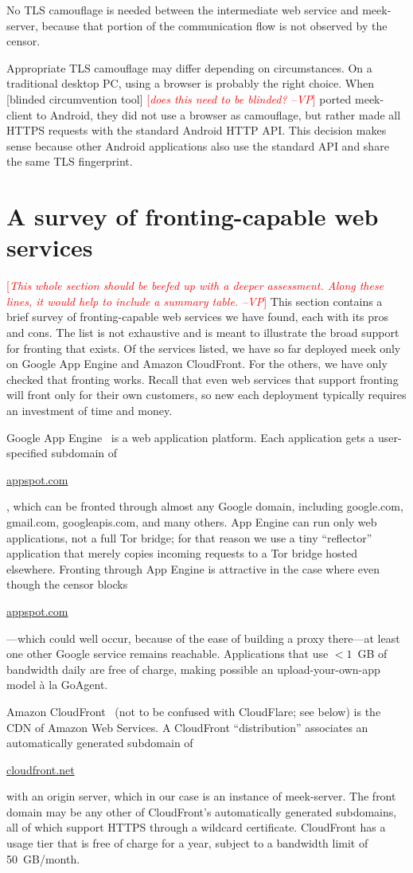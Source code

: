 \documentclass{sig-alternate}
\newcommand{\meekclient}{\mbox{meek-client}\xspace}
\newcommand{\meekserver}{\mbox{meek-server}\xspace}
\newcommand{\meek}{meek\xspace}
\def\urll#1{\begin{NoHyper}\url{#1}\end{NoHyper}}
\newcommand{\note}[1]{{\textcolor{red}{[\textit{#1}]}}}
\newcommand{\vp}[1]{\note{#1 --VP}}
\begin{document}
No TLS camouflage is needed between the intermediate web service and \meekserver,
because that portion of the communication flow is not observed by the censor.

Appropriate TLS camouflage may differ depending on circumstances.
On a traditional desktop PC, using a browser is probably the right choice.
When
[blinded circumvention tool]
\vp{does this need to be blinded?}
ported \meekclient to Android,
they did not use a browser as camouflage,
but rather made all HTTPS requests with the standard Android HTTP API.
This decision makes sense because other Android applications
also use the standard API and share the same TLS fingerprint.

\section{A survey of fronting-capable web services}
\label{sec:survey}

\vp{This whole section should be beefed up with a deeper assessment.  Along
these lines, it would help to include a summary table.}
This section contains a brief survey of fronting-capable
web services we have found, each with its pros and cons.
The list is not exhaustive and is meant to illustrate the broad
support for fronting that exists.
Of the services listed, we have so far deployed \meek
only on Google App Engine and Amazon CloudFront.
For the others, we have only checked that fronting works.
Recall that even web services that support fronting
will front only for their own customers,
so new each deployment typically requires an investment of time and money.

Google App Engine~\cite{googleappengine}
is a web application platform.
Each application gets a user-specified subdomain of \urll{appspot.com},
which can be fronted through almost any Google domain,
including google.com, gmail.com, googleapis.com, and many others.
App Engine can run only web applications,
not a full Tor bridge;
for that reason we use a tiny ``reflector'' application
that merely copies incoming requests to a Tor bridge hosted elsewhere.
Fronting through App Engine is attractive in the case where even though
the censor blocks
\urll{appspot.com}---which could well occur,
because of the ease of building a proxy there---at least one
other Google service remains reachable.
Applications that use $< 1$~GB of bandwidth daily
are free of charge,
making possible an upload-your-own-app model
à la GoAgent.

Amazon CloudFront~\cite{cloudfront}
(not to be confused with CloudFlare; see below)
is the CDN of Amazon Web Services.
A CloudFront ``distribution'' associates
an automatically generated subdomain of \urll{cloudfront.net}
with an origin server,
which in our case is an instance of \meekserver.
The front domain may be any other of CloudFront's automatically generated subdomains, all
of which support HTTPS through a wildcard certificate.
CloudFront has a usage tier that is free of charge for a year,
subject to a bandwidth limit of 50~GB/month.
\end{document}
